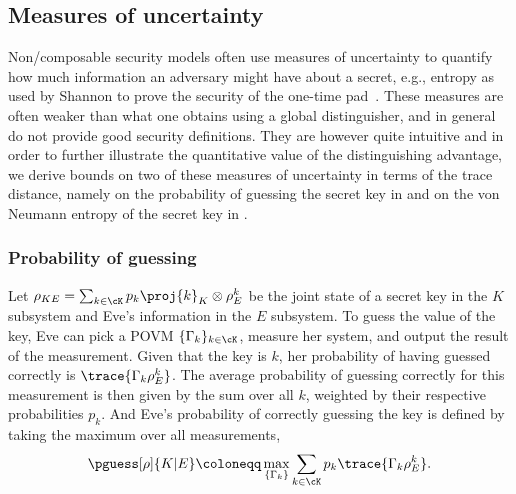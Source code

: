 

\subsection{Measures of uncertainty}
\label{app:op.local}

Non\-/composable security models often use measures of uncertainty to
quantify how much information an adversary might have about a secret,
e.g., entropy as used by Shannon to prove the security of the one-time
pad~\cite{Shannon49}. These measures are often weaker than what one
obtains using a global distinguisher, and in general do not provide
good security definitions. They are however quite intuitive and in
order to further illustrate the quantitative value of the
distinguishing advantage, we derive bounds on two of these measures of
uncertainty in terms of the trace distance, namely on the probability
of guessing the secret key in
 and on the von Neumann entropy of the
secret key in .

\subsubsection{Probability of guessing}
\label{app:op.local.guessing}

Let $\rho_{KE} = \sum_{k \in \cK} p_k \proj{k}_K \otimes \rho^k_E$ be
the joint state of a secret key in the $K$ subsystem and Eve's
information in the $E$ subsystem. To guess the value of the key, Eve
can pick a POVM $\{\Gamma_k\}_{k \in \cK}$, measure her system, and
output the result of the measurement. Given that the key is $k$, her
probability of having guessed correctly is $\trace{\Gamma_k
  \rho^k_E}$. The average probability of guessing correctly for this
measurement is then given by the sum over all $k$, weighted by their
respective probabilities $p_k$. And Eve's probability of correctly
guessing the key is defined by taking the maximum over all
measurements,
\begin{equation} \label{eq:pguess} \pguess[\rho]{K|E} \coloneqq
  \max_{\{\Gamma_k\}} \sum_{k \in \cK} p_k \trace{\Gamma_k \rho^k_E}.
\end{equation}

